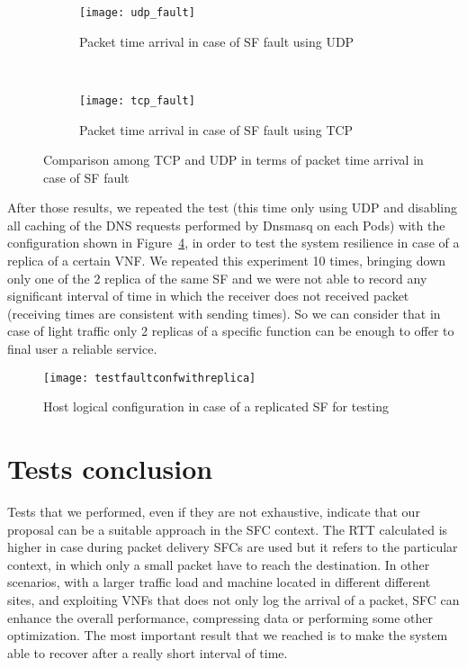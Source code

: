 \begin{figure}[]
    \begin{subfigure}[b]{0.9\textwidth}
        \texttt{[image: udp\_fault]}
        \caption{Packet time arrival in case of SF fault using UDP}
        \label{chap:tests:sec:fault:img:faultgraphudp}
    \end{subfigure}
    \\
    \begin{subfigure}[b]{0.9\textwidth}
        \texttt{[image: tcp\_fault]}
        \caption{Packet time arrival in case of SF fault using TCP}
        \label{chap:tests:sec:fault:img:faultgraphtcp}
    \end{subfigure}
    \caption{Comparison among TCP and UDP in terms of packet time arrival in
    case of SF fault}
    \label{chap:tests:sec:fault:img:faultgrapht}
\end{figure}

After those results, we repeated the test (this time only using UDP and
disabling all caching of the DNS requests performed by Dnsmasq on each Pods)
with the configuration shown in
Figure~\ref{chap:tests:sec:fault:img:testfaultconfwithreplica}, in order to
test the system resilience in case of a replica of a certain VNF. We repeated
this experiment 10 times, bringing down only one of the 2 replica of the same
SF and we were not able to record any significant interval of time in which the
receiver does not received packet (receiving times are consistent with sending
times). So we can consider that in case of light traffic only 2 replicas of a
specific function can be enough to offer to final user a reliable service.

\begin{figure}[H]
  \centering
  \texttt{[image: testfaultconfwithreplica]}
  \caption{Host logical configuration in case of a replicated SF for testing}
  \label{chap:tests:sec:fault:img:testfaultconfwithreplica}
\end{figure}

\section{Tests conclusion}
Tests that we performed, even if they are not exhaustive, indicate that our
proposal can be a suitable approach in the SFC context.
The RTT calculated is higher in case during packet delivery SFCs are used
but it refers to the particular context, in which only a small packet have to
reach the destination. In other scenarios, with a larger traffic load and
machine located in different different sites, and exploiting VNFs that does not
only log the arrival of a packet, SFC can enhance the overall performance,
compressing data or performing some other optimization. The most important
result that we reached is to make the system able to recover after a really
short interval of time.